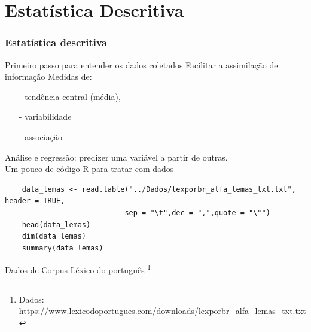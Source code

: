 \documentclass[graphics,14pt]{beamer}
\newcommand{\lfr}[1]{\let\thefootnote\relax\footnote{\hspace{0.6cm}\vspace{1.25cm} #1}}
\begin{document}
\section{Estatística Descritiva}
\begin{frame}[t,fragile=singleslide]
\frametitle{Estatística descritiva}
	Primeiro passo para entender os dados coletados
	Facilitar a assimilação de informação
	Medidas de:
	\begin{itemize}
		\item[-] tendência central (média), 
		\item[-] variabilidade
		\item[-] associação
	\end{itemize}
	Análise e regressão: predizer uma variável a partir de outras.\\
	\vspace{1.0cm}
	Um pouco de código R para tratar com dados
	\begin{lstlisting}
	data_lemas <- read.table("../Dados/lexporbr_alfa_lemas_txt.txt", header = TRUE, 
							sep = "\t",dec = ",",quote = "\"")
	head(data_lemas)
	dim(data_lemas)
	summary(data_lemas)
	\end{lstlisting}
	\vspace{1.0cm}	
	Dados de \href{https://www.lexicodoportugues.com/}{Corpus Léxico do português}
	\vfill
	\lfr{Dados: \url{https://www.lexicodoportugues.com/downloads/lexporbr_alfa_lemas_txt.txt}}

\end{frame}
\end{document}
